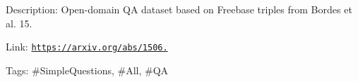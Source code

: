 Description\+: Open-\/domain QA dataset based on Freebase triples from Bordes et al. \textquotesingle{}15.

Link\+: \href{https://arxiv.org/abs/1506.02075}{\tt https\+://arxiv.\+org/abs/1506.}

Tags\+: \#\+Simple\+Questions, \#\+All, \#\+QA 